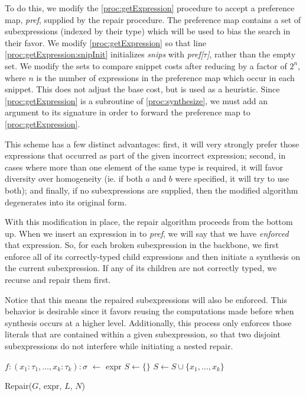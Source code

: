 To do this, we modify the \ref{proc:getExpression} procedure to accept a preference map, \textit{pref}, supplied by the repair procedure. The preference map contains a set of subexpressions (indexed by their type) which will be used to bias the search in their favor. We modify \ref{proc:getExpression} so that line \ref{proc:getExpression:snipInit} initializes \textit{snips} with \textit{pref[$\tau$]}, rather than the empty set. We modify the sets to compare snippet costs after reducing by a factor of $2^{n}$, where $n$ is the number of expressions in the preference map which occur in each snippet. This does not adjust the base cost, but is used as a heuristic. Since \ref{proc:getExpression} is a subroutine of \ref{proc:synthesize}, we must add an argument to its signature in order to forward the preference map to \ref{proc:getExpression}.

This scheme has a few distinct advantages: first, it will very strongly prefer those expressions that occurred as part of the given incorrect expression; second, in cases where more than one element of the same type is required, it will favor diversity over homogeneity (ie. if both $a$ and $b$ were specified, it will try to use both); and finally, if no subexpressions are supplied, then the modified algorithm degenerates into its original form.

With this modification in place, the repair algorithm proceeds from the bottom up. When we insert an expression  in to \textit{pref}, we will say that we have \textit{enforced} that expression. So, for each broken subexpression in the backbone, we first enforce all of its correctly-typed child expressions and then initiate a synthesis on the current subexpression. If any of its children are not correctly typed, we recurse and repair them first.

Notice that this means the repaired subexpressions will also be enforced. This behavior is desirable since it favors reusing the computations made before when synthesis occurs at a higher level. Additionally, this process  only enforces those literals that are contained within a given subexpression, so that two disjoint subexpressions do not interfere while initiating a nested repair.

\begin{procedure}
$f: (x_1: \tau_1, \ldots, x_k: \tau_k): \sigma$ $\leftarrow$ expr\;
$S \leftarrow \{\}$ \;
$S \leftarrow S \cup \{x_1,\ldots,x_k\}$ \;
\caption{Repair($G$, expr, $L$, $N$)}\label{proc:repair}
\end{procedure}
